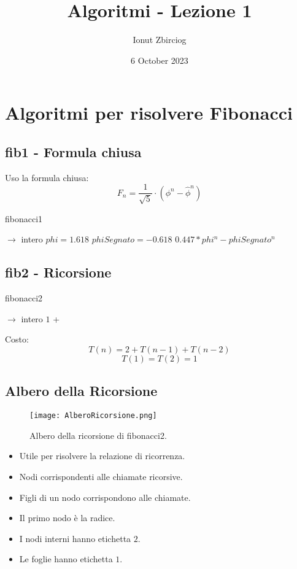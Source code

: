 \documentclass{article}
\title{Algoritmi - Lezione 1}
\author{Ionut Zbirciog}
\date{6 October 2023}
\begin{document}
\maketitle

\section{Algoritmi per risolvere Fibonacci}

\subsection{fib1 - Formula chiusa}
Uso la formula chiusa: 
\[F_n = \frac{1}{\sqrt{5}} \cdot (\phi^n - \hat{\phi}^n)\]
\begin{algorithm}
\caption{fibonacci1}
\begin{algorithmic}[1]
 $\rightarrow$ intero
    \State $phi = 1.618$
    \State $phiSegnato = -0.618$ 
    \State \Return $0.447 * phi^n - phiSegnato^n$
\EndFunction
\end{algorithmic}
\end{algorithm}


\subsection{fib2 - Ricorsione}
\begin{algorithm}
\caption{fibonacci2}
\begin{algorithmic}[1]
 $\rightarrow$ intero
    \State \Return $1$
  \Else
    \State \Return {} + 
  \EndIf
\EndFunction
\end{algorithmic}
\end{algorithm}
Costo: 
\[T(n) = 2 + T(n-1) + T(n-2)\]
\[T(1) = T(2) = 1\]

\subsection{Albero della Ricorsione}
\begin{figure}[h]
  \centering
  \texttt{[image: AlberoRicorsione.png]}
  \caption{Albero della ricorsione di fibonacci2.}
  \label{fig:image-label}
\end{figure}
\begin{itemize}
\item Utile per risolvere la relazione di ricorrenza.
\item Nodi corrispondenti alle chiamate ricorsive.
\item Figli di un nodo corrispondono alle chiamate.
\item Il primo nodo è la radice.
\item I nodi interni hanno etichetta $2$.
\item Le foglie hanno etichetta $1$.
\end{itemize}
\end{document}
